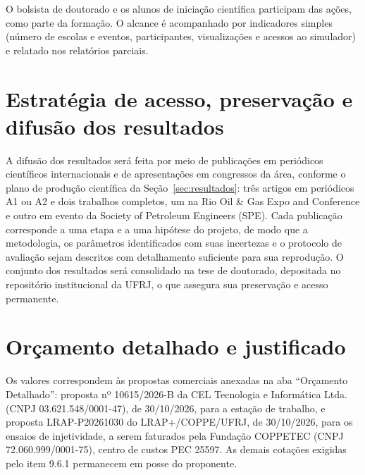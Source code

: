 \documentclass[10pt,a4paper]{article}
\newcommand{\itemedital}[1]{}
\begin{document}
\noindent O bolsista de doutorado e os alunos de iniciação científica participam das ações,
como parte da formação. O alcance é acompanhado por indicadores simples (número de escolas e eventos,
participantes, visualizações e acessos ao simulador) e relatado nos relatórios parciais.

\section{Estratégia de acesso, preservação e difusão dos resultados}\itemedital{Anexo 1 D}
A difusão dos resultados será feita por meio de publicações em periódicos científicos
internacionais e de apresentações em congressos da área, conforme o plano de produção
científica da Seção~\ref{sec:resultados}: três artigos em periódicos A1 ou A2 e dois
trabalhos completos, um na Rio Oil \& Gas Expo and Conference e outro em evento da Society
of Petroleum Engineers (SPE). Cada publicação corresponde a uma etapa e a uma hipótese do
projeto, de modo que a metodologia, os parâmetros identificados com suas incertezas e o
protocolo de avaliação sejam descritos com detalhamento suficiente para sua reprodução. O
conjunto dos resultados será consolidado na tese de doutorado, depositada no repositório
institucional da UFRJ, o que assegura sua preservação e acesso permanente.

\section{Orçamento detalhado e justificado}\label{sec:orcamento}\itemedital{2.16 XXV; 9; Anexo 1 H}

Os valores correspondem às propostas comerciais anexadas na aba ``Orçamento Detalhado'':
proposta nº 10615/2026-B da CEL Tecnologia e Informática Ltda. (CNPJ 03.621.548/0001-47),
de 30/10/2026, para a estação de trabalho, e proposta LRAP-P20261030 do LRAP+/COPPE/UFRJ,
de 30/10/2026, para os ensaios de injetividade, a serem faturados pela Fundação COPPETEC
(CNPJ 72.060.999/0001-75), centro de custos PEC 25597. As demais cotações exigidas pelo item 9.6.1
permanecem em posse do proponente.
\end{document}

